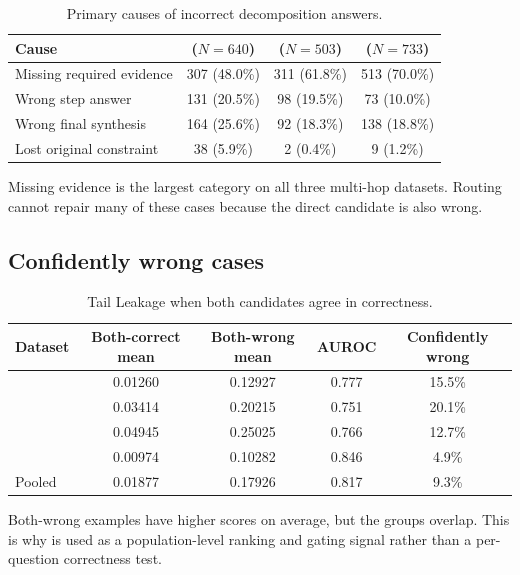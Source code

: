 \begin{table}[h]
\caption{Primary causes of incorrect decomposition answers.}
\label{tab:failure-taxonomy}
\centering
\scriptsize
\setlength{\tabcolsep}{3.5pt}
\begin{tabular}{lccc}
\toprule
Cause & \hotpot{} (\(N=640\)) & \twowiki{} (\(N=503\)) & \musique{} (\(N=733\)) \\
\midrule
Missing required evidence & 307 (48.0\%) & 311 (61.8\%) & 513 (70.0\%) \\
Wrong step answer & 131 (20.5\%) & 98 (19.5\%) & 73 (10.0\%) \\
Wrong final synthesis & 164 (25.6\%) & 92 (18.3\%) & 138 (18.8\%) \\
Lost original constraint & 38 (5.9\%) & 2 (0.4\%) & 9 (1.2\%) \\
\bottomrule
\end{tabular}
\end{table}

Missing evidence is the largest category on all three multi-hop datasets.
Routing cannot repair many of these cases because the direct candidate is also
wrong.

\subsection{Confidently wrong cases}

\begin{table}[h]
\caption{Tail Leakage when both candidates agree in correctness.}
\label{tab:quadrant-confidence}
\centering
\small
\setlength{\tabcolsep}{4.5pt}
\begin{tabular}{lcccc}
\toprule
Dataset & Both-correct mean & Both-wrong mean & AUROC & Confidently wrong \\
\midrule
\hotpot{} & 0.01260 & 0.12927 & 0.777 & 15.5\% \\
\twowiki{} & 0.03414 & 0.20215 & 0.751 & 20.1\% \\
\musique{} & 0.04945 & 0.25025 & 0.766 & 12.7\% \\
\popqa{} & 0.00974 & 0.10282 & 0.846 & 4.9\% \\
Pooled & 0.01877 & 0.17926 & 0.817 & 9.3\% \\
\bottomrule
\end{tabular}
\end{table}

Both-wrong examples have higher scores on average, but the groups overlap.
This is why \tailleak{} is used as a population-level ranking and gating signal
rather than a per-question correctness test.
